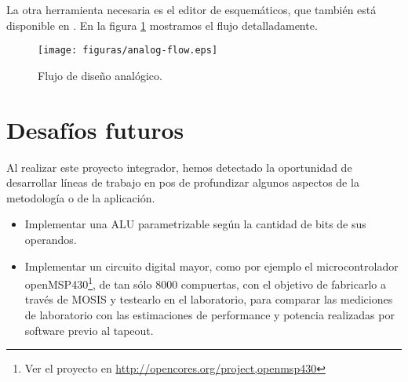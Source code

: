 La otra herramienta necesaria es el editor de esquemáticos, que también está disponible en . En la figura \ref{fig:aflow} mostramos el flujo detalladamente.


\begin{figure}[h]
  \centering
\texttt{[image: figuras/analog-flow.eps]}
  \caption{Flujo de diseño analógico.}
\label{fig:aflow}
\end{figure}
\section{Desafíos futuros}
Al realizar este proyecto integrador, hemos detectado la oportunidad de desarrollar líneas de trabajo en pos de profundizar algunos aspectos de la metodología o de la aplicación.  
\begin{itemize}
   \begin{itemize}
   \item Aportar al desarrollo del motor de simulación , implementando algunos tipos de análisis que actualmente no soporta: análisis de ruido, zp, etc.
   \item Aportar al desarrollo del sintetizador lógico Yosys
   \item Crear un conjunto de  que realicen una batería de simulaciones \gls{spice} para caracterizar celdas estándar y crear los modelos de tiempo de propagación y potencia en el formato Liberty. Este es un proyecto conceptualmente simple, cuya dificultad reside en lograr el mayor nivel de automatización posible.
   \item Mejorar la herramienta de extracción de parásitos de 
   \end{itemize} 
\item Implementar una ALU parametrizable según la cantidad de bits de sus operandos.
\item Implementar un circuito digital mayor, como por ejemplo el microcontrolador openMSP430\footnote{Ver el proyecto en \url{http://opencores.org/project,openmsp430}}, de tan sólo 8000 compuertas, con el objetivo de fabricarlo a través de MOSIS y testearlo en el laboratorio, para comparar las mediciones de laboratorio con las estimaciones de performance y potencia realizadas por software previo al \gls{tapeout}.


\end{itemize}






